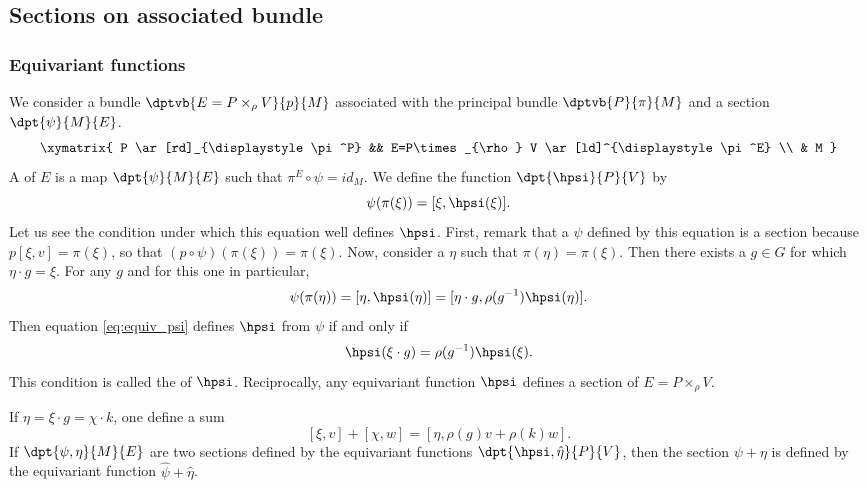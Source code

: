 								\subsection{Sections on associated bundle}  \label{sec_fnequiv}

								\subsubsection{Equivariant functions}

								We consider a bundle $\dptvb{E=P\times_{\rho} V}{p}{M}$ associated with the principal bundle $\dptvb{P}{\pi}{M}$ and a section $\dpt{\psi}{M}{E}$.
								\[
									\xymatrix{ P \ar[rd]_{\displaystyle\pi^P} &&
										E=P\times_{\rho} V \ar[ld]^{\displaystyle\pi^E} \\ & M }
										\]
										A  of $E$ is a map $\dpt{\psi}{M}{E}$ such that $\pi^E\circ\psi=id_M$. We define the function $\dpt{\hpsi}{P}{V}$ by
										\begin{equation}\label{eq:equiv_psi}
										\psi(\pi(\xi))=[\xi,\hpsi(\xi)].
										\end{equation}
										Let us see the condition under which this equation well defines $\hpsi$. First, remark that a $\psi$ defined by this equation is a section because $p[\xi,v]=\pi(\xi)$, so that $(p\circ\psi)(\pi(\xi))=\pi(\xi)$. Now, consider a $\eta$ such that $\pi(\eta)=\pi(\xi)$. Then there exists a $g\in G$ for which $\eta\cdot g=\xi$. For any $g$ and for this one in particular,
										\[
											\psi(\pi(\eta))=[\eta,\hpsi(\eta)]=[\eta\cdot g,\rho(g^{-1})\hpsi(\eta)].
											\]
											Then equation \eqref{eq:equiv_psi} defines $\hpsi$ from $\psi$ if and only if
											\begin{equation}\label{eq:equiv_psi_b}
											\hpsi(\xi\cdot g)=\rho(g^{-1})\hpsi(\xi).
											\end{equation}
											This condition is called the  of $\hpsi$. Reciprocally, any equivariant function $\hpsi$ defines a section of $E=P\times_{\rho} V$.

											If $\eta=\xi\cdot g=\chi\cdot k$, one define a sum
											\begin{equation}\label{eq:def:som_E}
											[\xi,v]+[\chi,w]=[\eta,\rho(g)v+\rho(k)w].
											\end{equation}
											If $\dpt{\psi,\eta}{M}{E}$ are two sections defined by the equivariant functions $\dpt{\hpsi,\hat\eta}{P}{V}$, then the section $\psi+\eta$ is defined by the equivariant function $\hat\psi+\hat \eta$.

